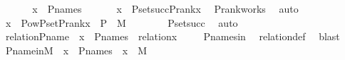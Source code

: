 \begin{isabellebody}
%
\isadelimproof
%
\endisadelimproof
%
\isatagproof
{}\isamarkupfalse%
\ {\isacharminus}{\kern0pt}\ \isanewline
\ \ \isamarkupfalse%
\ {\isachardoublequoteopen}x\ {\isasymin}\ P{\isacharunderscore}{\kern0pt}names{\isachardoublequoteclose}\ \isanewline
\ \ \isamarkupfalse%
\ \isamarkupfalse%
\ {\isachardoublequoteopen}x\ {\isasymin}\ P{\isacharunderscore}{\kern0pt}set{\isacharparenleft}{\kern0pt}succ{\isacharparenleft}{\kern0pt}P{\isacharunderscore}{\kern0pt}rank{\isacharparenleft}{\kern0pt}x{\isacharparenright}{\kern0pt}{\isacharparenright}{\kern0pt}{\isacharparenright}{\kern0pt}{\isachardoublequoteclose}\ \isamarkupfalse%
\ P{\isacharunderscore}{\kern0pt}rank{\isacharunderscore}{\kern0pt}works\ \isamarkupfalse%
\ auto\ \isanewline
\ \ \isamarkupfalse%
\ \isamarkupfalse%
\ {\isachardoublequoteopen}x\ {\isasymin}\ Pow{\isacharparenleft}{\kern0pt}P{\isacharunderscore}{\kern0pt}set{\isacharparenleft}{\kern0pt}P{\isacharunderscore}{\kern0pt}rank{\isacharparenleft}{\kern0pt}x{\isacharparenright}{\kern0pt}{\isacharparenright}{\kern0pt}\ {\isasymtimes}\ P{\isacharparenright}{\kern0pt}\ {\isasyminter}\ M{\isachardoublequoteclose}\ \ \isanewline
\ \ \ \ \isamarkupfalse%
\ P{\isacharunderscore}{\kern0pt}set{\isacharunderscore}{\kern0pt}succ\ \isamarkupfalse%
\ auto\ \isanewline
{}\isamarkupfalse%
%
\endisatagproof
{\isafoldproof}%
%
\isadelimproof
\isanewline
%
\endisadelimproof
\isanewline
{}\isamarkupfalse%
\ relation{\isacharunderscore}{\kern0pt}P{\isacharunderscore}{\kern0pt}name\ {\isacharcolon}{\kern0pt}\ {\isachardoublequoteopen}x\ {\isasymin}\ P{\isacharunderscore}{\kern0pt}names\ {\isasymLongrightarrow}\ relation{\isacharparenleft}{\kern0pt}x{\isacharparenright}{\kern0pt}{\isachardoublequoteclose}\ \isanewline
%
\isadelimproof
\ \ %
\endisadelimproof
%
\isatagproof
{}\isamarkupfalse%
\ P{\isacharunderscore}{\kern0pt}names{\isacharunderscore}{\kern0pt}in\ \isamarkupfalse%
\ relation{\isacharunderscore}{\kern0pt}def\ \isamarkupfalse%
\ blast%
\endisatagproof
{\isafoldproof}%
%
\isadelimproof
\ \isanewline
%
\endisadelimproof
\isanewline
{}\isamarkupfalse%
\ P{\isacharunderscore}{\kern0pt}name{\isacharunderscore}{\kern0pt}in{\isacharunderscore}{\kern0pt}M\ {\isacharcolon}{\kern0pt}\ {\isachardoublequoteopen}x\ {\isasymin}\ P{\isacharunderscore}{\kern0pt}names\ {\isasymLongrightarrow}\ x\ {\isasymin}\ M{\isachardoublequoteclose}\ \isanewline

\end{isabellebody}
